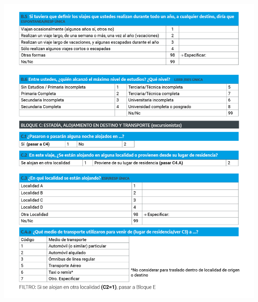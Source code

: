 \documentclass[
]{book}
\begin{document}
\begin{center}\includegraphics[width=1\linewidth]{imagenes/graf03} \end{center}
\end{document}
